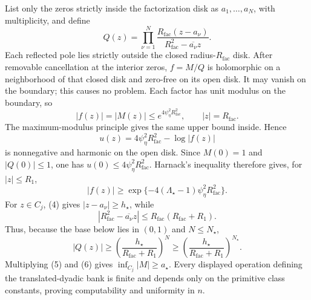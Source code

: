 List only the zeros strictly inside the factorization disk as \(a_1,\ldots,a_N\), with multiplicity, and define
\[
 Q(z)=\prod_{\nu=1}^N
 \frac{R_{\mathrm{fac}}(z-a_\nu)}
      {R_{\mathrm{fac}}^2-\overline{a_\nu}z}.
\]
Each reflected pole lies strictly outside the closed radius-\(R_{\mathrm{fac}}\) disk.  After removable cancellation at the interior zeros, \(f=M/Q\) is holomorphic on a neighborhood of that closed disk and zero-free on its open disk.  It may vanish on the boundary; this causes no problem.  Each factor has unit modulus on the boundary, so
\[
 |f(z)|=|M(z)|\le e^{4\psi_{\eta}^2R_{\mathrm{fac}}^2},
 \qquad |z|=R_{\mathrm{fac}}.
\]
The maximum-modulus principle gives the same upper bound inside.  Hence
\[
 u(z)=4\psi_{\eta}^2R_{\mathrm{fac}}^2-\log|f(z)|
\]
is nonnegative and harmonic on the open disk.  Since \(M(0)=1\) and \(|Q(0)|\le1\), one has \(u(0)\le4\psi_{\eta}^2R_{\mathrm{fac}}^2\).  Harnack's inequality therefore gives, for \(|z|\le R_1\),
\[
 |f(z)|\ge
 \exp\{-4(\Lambda_{\star}-1)\psi_{\eta}^2R_{\mathrm{fac}}^2\}. \tag{5}
\]
For \(z\in C_j\), (4) gives \(|z-a_\nu|\ge h_{\star}\), while
\[
 |R_{\mathrm{fac}}^2-\overline{a_\nu}z|
 \le R_{\mathrm{fac}}(R_{\mathrm{fac}}+R_1).
\]
Thus, because the base below lies in \((0,1)\) and \(N\le N_{\star}\),
\[
 |Q(z)|\ge
 \left(\frac{h_{\star}}{R_{\mathrm{fac}}+R_1}\right)^N
 \ge
 \left(\frac{h_{\star}}{R_{\mathrm{fac}}+R_1}\right)^{N_{\star}}. \tag{6}
\]
Multiplying (5) and (6) gives \(\inf_{C_j}|M|\ge a_{\star}\).  Every displayed operation defining the translated-dyadic bank is finite and depends only on the primitive class constants, proving computability and uniformity in \(n\).